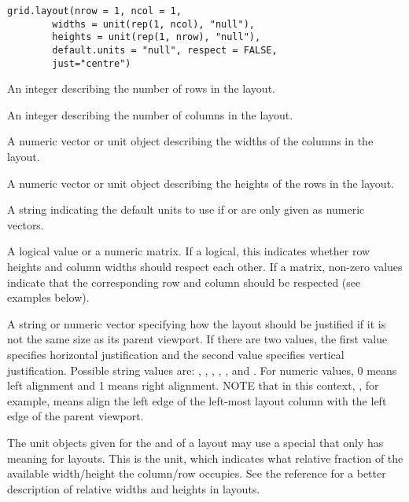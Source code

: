 %
\begin{Usage}
\begin{verbatim}
grid.layout(nrow = 1, ncol = 1,
        widths = unit(rep(1, ncol), "null"),
        heights = unit(rep(1, nrow), "null"),
        default.units = "null", respect = FALSE,
        just="centre")
\end{verbatim}
\end{Usage}
%
\begin{Arguments}
\begin{ldescription}
\item[\code{nrow}] An integer describing the number of rows in the layout.
\item[\code{ncol}] An integer describing the number of columns in the layout.
\item[\code{widths}] A numeric vector or unit object
describing the widths of the columns
in the layout.
\item[\code{heights}] A numeric vector or unit object
describing the heights of the rows
in the layout.
\item[\code{default.units}] A string indicating the default units to use
if  or  are only given as numeric vectors. 
\item[\code{respect}] A logical value or a numeric matrix.
If a logical, this indicates whether
row heights and column widths should respect each other.
If a matrix, non-zero values indicate that the corresponding
row and column should be respected (see examples below).

\item[\code{just}] A string or numeric
vector specifying how the 
layout should be
justified if it is not the same size as its parent viewport.
If there are two values, the first
value specifies horizontal justification and the second value specifies
vertical justification.  Possible string values are: ,
, , , ,
and .  For numeric values, 0 means left alignment
and 1 means right alignment. NOTE that in this context,
, for example, means align the left
edge of the left-most layout column with the left edge of the
parent viewport.
\end{ldescription}
\end{Arguments}
%
\begin{Details}\relax
The unit objects given for the  and 
of a layout may use a special  that only has
meaning for layouts.  This is the  unit, which
indicates what relative fraction of the available width/height the
column/row occupies.  See the reference for a better description
of relative widths and heights in layouts.
\end{Details}
